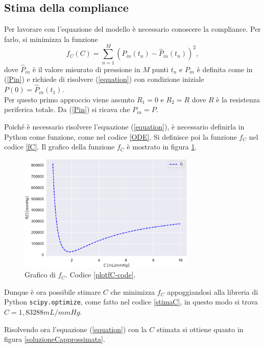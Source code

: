 \subsection{Stima della compliance}
Per lavorare con l'equazione del modello è necessario conoscere la compliance. Per farlo, si minimizza la funzione
\[
f_C(C)=\sum_{n=1}^M\left( P_{in}(t_n)-\hat{P}_{in}(t_n)\right)^2,
\]
dove $\hat{P}_{in}$ è il valore misurato di pressione in $M$ punti $t_n$ e $P_{in}$ è definita come in (\ref{Pin}) e richiede di risolvere (\ref{equation}) con condizione iniziale $P(0)=\hat{P}_{in}(t_1)$.\\
Per questo primo approccio viene assunto $R_1=0$ e $R_2=R$ dove $R$ è la resistenza periferica totale. Da (\ref{Pin}) si ricava che $P_{in}=P$.\\

\newpage

Poiché è necessario risolvere l'equazione (\ref{equation}), è necessario definirla in Python come funzione, come nel codice \ref{ODE}. Si definisce poi la funzione $f_C$ nel codice \ref{fC}. Il grafico della funzione $f_C$ è mostrato in figura \ref{plotfC}.

\begin{figure}[h]
    \centering
    \includegraphics[width=0.75\textwidth]{images/Windkessel/f_C.pdf}
    \caption{Grafico di $f_C$. Codice \ref{plotfC-code}.}
    \label{plotfC}
\end{figure}



Dunque è ora possibile stimare $C$ che minimizza $f_C$ appoggiandosi alla libreria di Python \texttt{scipy.optimize}, come fatto nel codice \ref{stimaC}, in questo modo si trova $C=1,83288 mL/mmHg$.



Risolvendo ora l'equazione (\ref{equation}) con la $C$ stimata si ottiene quanto in figura \ref{soluzioneCapprossimata}.


